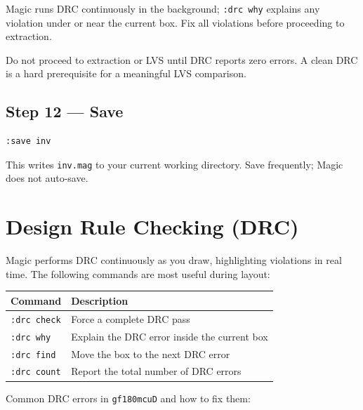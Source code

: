 \documentclass[11pt]{article}
\begin{document}
Magic runs DRC continuously in the background; \texttt{:drc why}
explains any violation under or near the current box.
Fix all violations before proceeding to extraction.

\begin{warnbox}
Do not proceed to extraction or LVS until DRC reports zero errors.
A clean DRC is a hard prerequisite for a meaningful LVS comparison.
\end{warnbox}

\subsection{Step 12 --- Save}

\begin{lstlisting}
:save inv
\end{lstlisting}

This writes \texttt{inv.mag} to your current working directory.
Save frequently; Magic does not auto-save.

\section{Design Rule Checking (DRC)}

Magic performs DRC continuously as you draw, highlighting violations in
real time.
The following commands are most useful during layout:

\begin{center}
\begin{tabular}{@{}lp{9.5cm}@{}}
\toprule
\textbf{Command}    & \textbf{Description} \\
\midrule
\texttt{:drc check} & Force a complete DRC pass \\
\texttt{:drc why}   & Explain the DRC error inside the current box \\
\texttt{:drc find}  & Move the box to the next DRC error \\
\texttt{:drc count} & Report the total number of DRC errors \\
\bottomrule
\end{tabular}
\end{center}

Common DRC errors in \texttt{gf180mcuD} and how to fix them:
\end{document}
